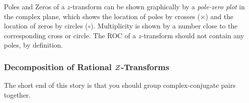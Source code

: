\begin{definition}\label{def:Pole-Zero Plot of Z-Transform}
  Poles and Zeros of a $z$-transform can be shown graphically by a \emph{pole-zero plot} in the complex plane, which shows the location of poles by crosses ($\times$) and the location of zeros by circles ($\circ$).
  Multiplicity is shown by a number close to the corresponding cross or circle.
  The ROC of a $z$-transform should not contain any poles, by definition.
\end{definition}

\subsubsection{Decomposition of Rational \texorpdfstring{$\operatorname{\mathcal{Z}}$-Transforms}{Z-Transform}}\label{subsubsec:Decompose Rational Z-Transforms}
The short end of this story is that you should group complex-conjugate pairs together.

